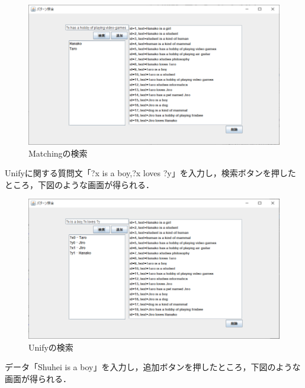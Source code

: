 \documentclass[12pt]{jarticle}
\begin{document}
\begin{figure}[!hbt]
  	\begin{center}
  		\includegraphics[scale=0.60]{images/scs2-3-2.png}
	\end{center}
  	\caption{Matchingの検索}
\end{figure}
\clearpage

Unifyに関する質問文「?x is a boy,?x loves ?y」を入力し，検索ボタンを押したところ，下図のような画面が得られる．

\begin{figure}[!hbt]
  	\begin{center}
  		\includegraphics[scale=0.60]{images/scs2-3-6.png}
	\end{center}
  	\caption{Unifyの検索}
\end{figure}
\clearpage

データ「Shuhei is a boy」を入力し，追加ボタンを押したところ，下図のような画面が得られる．
\end{document}
